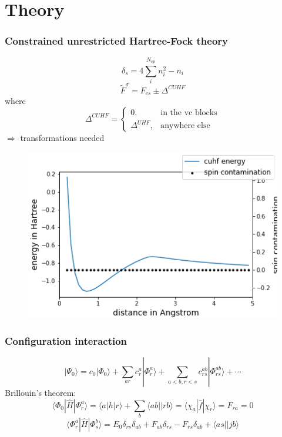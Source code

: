 \documentclass[aspectratio=169]{beamer}
\begin{document}
\section{Theory}

\begin{frame}
    \frametitle{Constrained unrestricted Hartree-Fock theory}
    \begin{equation}\label{eq:spincontfinal}
        \delta_s = 4\sum^{N_{cp}}_i n_i^2 - n_i
      \end{equation}
    \begin{equation}
        \tilde{F}^{\sigma} = F_{cs} \pm \Delta^{CUHF}
    \end{equation}
    where
    \begin{equation}
        \Delta^{CUHF} = \begin{cases}
            0, & \mbox{in the vc blocks} \\
            \Delta^{UHF}, & \mbox{anywhere else}
        \end{cases}
    \end{equation}
    $\Longrightarrow$ transformations needed
\end{frame}

\begin{frame}
    \begin{figure}
        \includegraphics[width=0.6\linewidth]{./figures/cuhf_mix.png}
    \end{figure}
\end{frame}

\begin{frame}
    \frametitle{Configuration interaction} 
    \begin{equation}\label{eq:lincomb}
        |\Psi_0\rangle = c_0|\Phi_0\rangle + \sum_{ar}c_{r}^{a}|\Phi_r^a\rangle + \sum_{a<b,r<s}c_{rs}^{ab}|\Phi^{ab}_{rs} \rangle + \cdots
      \end{equation}
      Brillouin's theorem:
      \begin{equation}\label{eq:overlapsingle}
        \langle\Phi_0 |\hat{H}|\Phi_r^a\rangle = \langle a|h|r \rangle + \sum_b \langle ab||rb \rangle = \langle \chi_a |\hat{f}| \chi_r \rangle = F_{ra} = 0
      \end{equation}
      \begin{equation}\label{eq:matrixelement}
        \langle \Phi_r^a|\hat{H}|\Phi_s^b \rangle = E_0\delta_{rs}\delta_{ab} + F_{ab}\delta_{rs} - F_{rs}\delta_{ab} + \langle as || jb \rangle
      \end{equation}
\end{frame}
\end{document}
